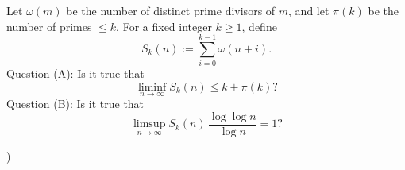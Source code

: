 \noindent Let $\omega(m)$ be the number of distinct prime divisors of $m$, and let $\pi(k)$ be the number of primes $\le k$.
For a fixed integer $k\ge 1$, define
\[
S_k(n) := \sum_{i=0}^{k-1} \omega(n+i).
\]
Question (A): Is it true that
\[
\liminf_{n\to\infty} S_k(n) \le k + \pi(k) ?
\]
Question (B): Is it true that
\[
\limsup_{n\to\infty} S_k(n)\,\frac{\log\log n}{\log n} = 1?
\]

)
